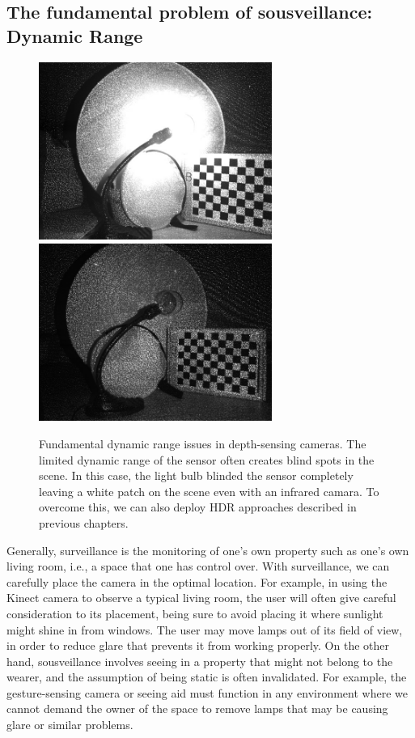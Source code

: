 \subsection{The fundamental problem of sousveillance: Dynamic Range}
\begin{figure}
\centering
\includegraphics[width=3.0in]{ch4/diagrams/high_expo_light.jpg} 
\includegraphics[width=3.0in]{ch4/diagrams/no_light_depth.jpg} \\
\caption{Fundamental dynamic range issues in depth-sensing cameras. The limited dynamic range of the sensor often creates blind spots in the scene. In this case, the light bulb blinded the sensor completely leaving a white patch on the scene even with an infrared camara. To overcome this, we can also deploy HDR approaches described in previous chapters.}
\label{fig:ir_range_issue}
\end{figure}

Generally, surveillance is the monitoring of one's own property such as one's own living room, i.e., a space that one has control over. With surveillance, we can carefully place the camera in the optimal location. For example, in using the Kinect camera to observe a typical living room, the user will often give careful consideration to its placement, being sure to avoid placing it where sunlight might shine in from windows. The user may move lamps out of its field of view, in order to reduce glare that prevents it from working properly.  On the other hand, sousveillance involves seeing in a property that might not belong to the wearer, and the assumption of being static is often invalidated. For example, the gesture-sensing camera or seeing aid must function in any environment where we cannot demand the owner of the space to remove lamps that may be causing glare or similar problems.

